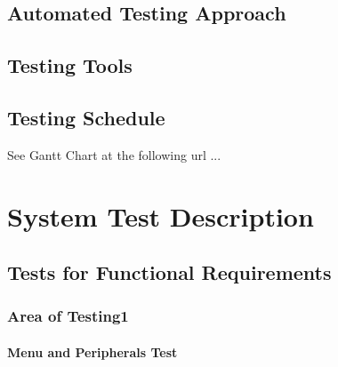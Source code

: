 \documentclass[12pt, titlepage]{article}
\begin{document}
\subsection{Automated Testing Approach}


\subsection{Testing Tools}


\subsection{Testing Schedule}

	
See Gantt Chart at the following url ...

\section{System Test Description}
	
\subsection{Tests for Functional Requirements}

\subsubsection{Area of Testing1}
		
\paragraph{Menu and Peripherals Test}
\end{document}
